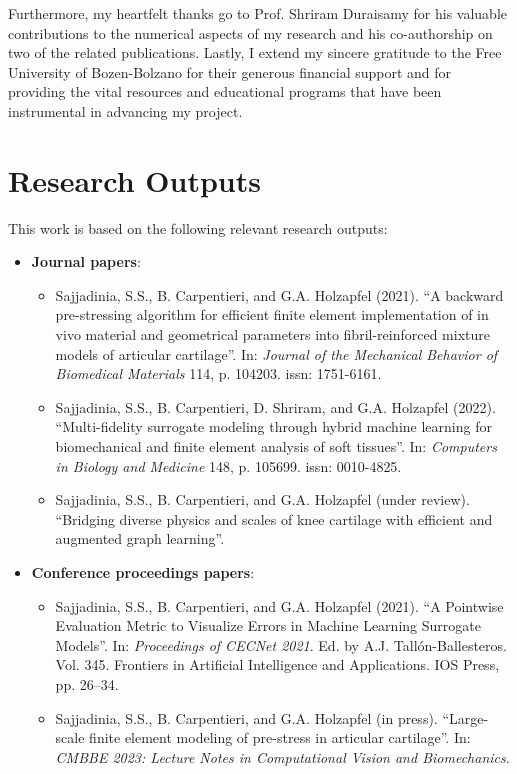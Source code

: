 \documentclass[12pt,a4paper]{report}
\begin{document}
Furthermore, my heartfelt thanks go to Prof. Shriram Duraisamy for his valuable contributions to the numerical aspects of my research and his co-authorship on two of the related publications. Lastly, I extend my sincere gratitude to the Free University of Bozen-Bolzano for their generous financial support and for providing the vital resources and educational programs that have been instrumental in advancing my project.

\chapter*{Research Outputs}
This work is based on the following relevant research outputs:
%
\begin{itemize}
\item \textbf{Journal papers}:
\begin{itemize}
    \item Sajjadinia, S.S., B. Carpentieri, and G.A. Holzapfel (2021). “A backward pre-stressing algorithm for efficient finite element implementation of in vivo material and geometrical parameters into fibril-reinforced mixture models of articular cartilage”. In: \textit{Journal of the Mechanical Behavior of Biomedical Materials} 114, p. 104203. issn: 1751-6161.
    \item Sajjadinia, S.S., B. Carpentieri, D. Shriram, and G.A. Holzapfel (2022). “Multi-fidelity surrogate modeling through hybrid machine learning for biomechanical and finite element analysis of soft tissues”. In: \textit{Computers in Biology and Medicine} 148, p. 105699. issn: 0010-4825.
    \item Sajjadinia, S.S., B. Carpentieri, and G.A. Holzapfel (under review). “Bridging diverse physics and scales of knee cartilage with efficient and augmented graph learning”.
\end{itemize}
\item \textbf{Conference proceedings papers}:
\begin{itemize}
    \item Sajjadinia, S.S., B. Carpentieri, and G.A. Holzapfel (2021). “A Pointwise Evaluation Metric to Visualize Errors in Machine Learning Surrogate Models”. In: \textit{Proceedings of CECNet 2021}. Ed. by A.J. Tall\'{o}n-Ballesteros. Vol. 345. Frontiers in Artificial Intelligence and Applications. IOS Press, pp. 26–34.
    \item Sajjadinia, S.S., B. Carpentieri, and G.A. Holzapfel (in press). “Large-scale finite element modeling of pre-stress in articular cartilage”. In: \textit{CMBBE 2023: Lecture Notes in Computational Vision and Biomechanics}.

\end{itemize}
\end{itemize}
\end{document}
